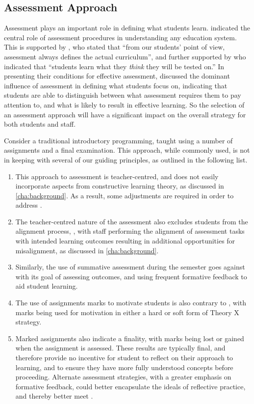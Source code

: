 \subsection{Assessment Approach} %
\label{sub:assessment_approach}

Assessment plays an important role in defining what students learn. \citet{Rowntree:1977} indicated the central role of assessment procedures in understanding any education system. This is supported by \citet{Ramsden:1992}, who stated that ``from our students' point of view, assessment always defines the actual curriculum'', and further supported by \citet{Biggs:2007} who indicated that ``students learn what they \emph{think} they will be tested on.'' In presenting their conditions for effective assessment, \citet{Gibbs:2004} discussed the dominant influence of assessment in defining what students focus on, indicating that students are able to distinguish between what assessment requires them to pay attention to, and what is likely to result in effective learning. So the selection of an assessment approach will have a significant impact on the overall strategy for both students and staff. 

Consider a traditional introductory programming, taught using a number of assignments and a final examination. This approach, while commonly used, is not in keeping with several of our guiding principles, as outlined in the following list. 

\begin{enumerate}
	\item This approach to assessment is teacher-centred, and does not easily incorporate aspects from constructive learning theory, as discussed in \cref{cha:background}.  As a result, some adjustments are required in order to address .
	\item The teacher-centred nature of the assessment also excludes students from the alignment process, , with staff performing the alignment of assessment tasks with intended learning outcomes resulting in additional opportunities for misalignment, as discussed in \cref{cha:background}. 
	\item Similarly, the use of summative assessment during the semester goes against  with its goal of assessing outcomes, and using frequent formative feedback to aid student learning.
	\item The use of assignments marks to motivate students is also contrary to , with marks being used for motivation in either a hard or soft form of Theory X strategy.
	\item Marked assignments also indicate a finality, with marks being lost or gained when the assignment is assessed. These results are typically final, and therefore provide no incentive for student to reflect on their approach to learning, and to ensure they have more fully understood concepts before proceeding. Alternate assessment strategies, with a greater emphasis on formative feedback, could better encapsulate the ideals of reflective practice, and thereby better meet .
\end{enumerate}

